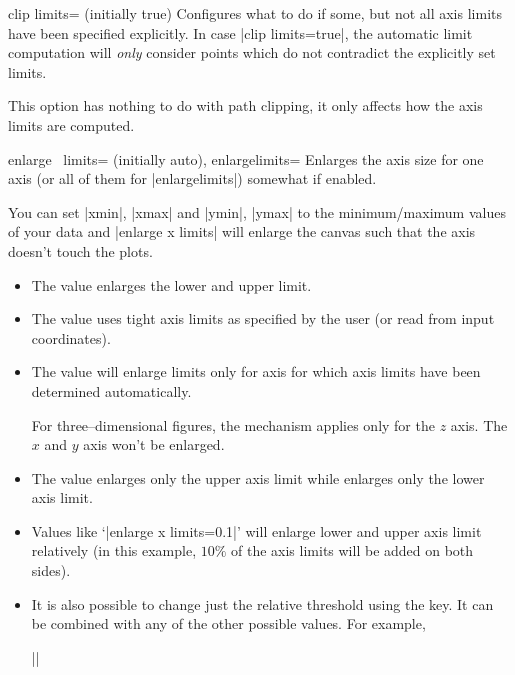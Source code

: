 \begin{pgfplotskey}{clip limits= (initially true)}
	Configures what to do if some, but not all axis limits have been specified explicitly. In case |clip limits=true|, the automatic limit computation will \emph{only} consider points which do not contradict the explicitly set limits. 

	This option has nothing to do with path clipping, it only affects how the axis limits are computed.
\end{pgfplotskey}

\begin{pgfplotsxykeylist}{enlarge \x\ limits= (initially auto),
	enlargelimits=}
Enlarges the axis size for one axis (or all of them for |enlargelimits|) somewhat if enabled.

You can set |xmin|, |xmax| and |ymin|, |ymax| to the minimum/maximum values of your data and |enlarge x limits| will enlarge the canvas such that the axis doesn't touch the plots.

\begin{itemize}
	\item The value  enlarges the lower and upper limit.
	\item The value  uses tight axis limits as specified by the user (or read from input coordinates).
	\item The value  will enlarge limits only for axis for which axis limits have been determined automatically.

	For three--dimensional figures, the  mechanism applies only for the $z$ axis. The $x$ and $y$ axis won't be enlarged. 
	\item The value  enlarges only the upper axis limit while  enlarges only the lower axis limit.
	\item Values like `|enlarge x limits=0.1|' will enlarge lower and upper axis limit relatively (in this example, $10\%$ of the axis limits will be added on both sides).
	\item It is also possible to change just the relative threshold using the  key. It can be combined with any of the other possible values. For example, 

		||
	

\end{itemize}
\end{pgfplotsxykeylist}
